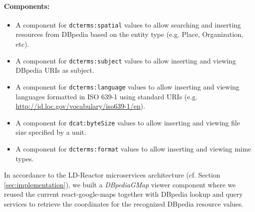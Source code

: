 \documentclass{llncs}
\begin{document}
\paragraph{Components:}
\small
\begin{itemize}
 \item A component for \texttt{dcterms:spatial} values to allow searching and inserting resources from DBpedia based on the entity type (e.g. Place, Organization, etc).
 \item A component for \texttt{dcterms:subject} values to allow inserting and viewing DBpedia URIs as subject.
 \item A component for \texttt{dcterms:language} values to allow inserting and viewing languages formatted in ISO 639-1 using standard URIs (e.g.  \url{http://id.loc.gov/vocabulary/iso639-1/en}).
 \item A component for \texttt{dcat:byteSize} values to allow inserting and viewing file size specified by a unit.
  \item A component for \texttt{dcterms:format} values to allow inserting and viewing mime types.
\end{itemize}

In accordance to the LD-Reactor microservices architecture (cf. Section \ref{sec:implementation}), we built a \emph{DBpediaGMap} viewer component where we reused the current react-google-maps together with DBpedia lookup and query services to retrieve the coordinates for the recognized DBpedia resource values.
\end{document}
